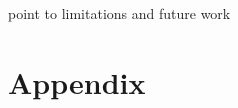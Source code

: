 \documentclass[
10pt, %
a4paper, %
oneside, %
headinclude,footinclude, %
] {book}%
\begin{document}
point to limitations and future work





 



\newpage
\appendix
\chapter{Appendix}
\end{document}
